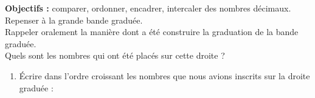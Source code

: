 \begin{activite}
    {\bf Objectifs :} comparer, ordonner, encadrer, intercaler des nombres décimaux.
       \partie[réinvestissement]
          Repenser à la grande bande graduée. \\
          Rappeler oralement la manière dont a été construire la graduation de la bande graduée. \\
          Quels sont les nombres qui ont été placés sur cette droite ?

          \makebox[\linewidth]{\dotfill}          
       
          \begin{enumerate}
             \item Écrire dans l'ordre croissant les nombres que nous avions inscrits sur la droite graduée :
             
             \medskip\makebox[\linewidth]{\dotfill}


\end{enumerate}
\end{activite}
